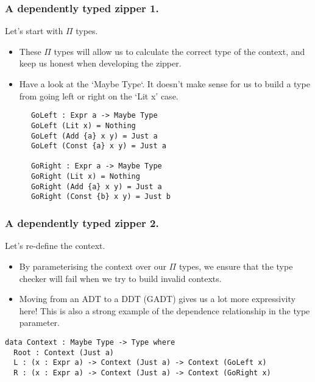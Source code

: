 \documentclass{beamer}
\begin{document}
\begin{frame}[fragile]
  \frametitle{A dependently typed zipper 1.}
  \begin{block}{Let's start with $\Pi$ types.}
    \begin{itemize}
    \item These $\Pi$ types will allow us to calculate the correct type
          of the context, and keep us honest when developing the zipper.
    \item Have a look at the `Maybe Type`. It doesn't make sense for us to
          build a type from going left or right on the `Lit x' case.
    \end{itemize}
    \begin{verbatim}
      GoLeft : Expr a -> Maybe Type
      GoLeft (Lit x) = Nothing
      GoLeft (Add {a} x y) = Just a
      GoLeft (Const {a} x y) = Just a

      GoRight : Expr a -> Maybe Type
      GoRight (Lit x) = Nothing
      GoRight (Add {a} x y) = Just a
      GoRight (Const {b} x y) = Just b
    \end{verbatim}
  \end{block}
\end{frame}

\begin{frame}[fragile]
  \frametitle{A dependently typed zipper 2.}
  \begin{block}{Let's re-define the context.}
    \begin{itemize}
      \item By parameterising the context over our $\Pi$ types, we
        ensure that the type checker will fail when we try to build
        invalid contexts.
      \item Moving from an ADT to a DDT (GADT) gives us a lot more
        expressivity here! This is also a strong example of the
        dependence relationship in the type parameter.
    \end{itemize}
    \begin{verbatim}
data Context : Maybe Type -> Type where
  Root : Context (Just a)
  L : (x : Expr a) -> Context (Just a) -> Context (GoLeft x)
  R : (x : Expr a) -> Context (Just a) -> Context (GoRight x)
    \end{verbatim}
  \end{block}
\end{frame}
\end{document}
